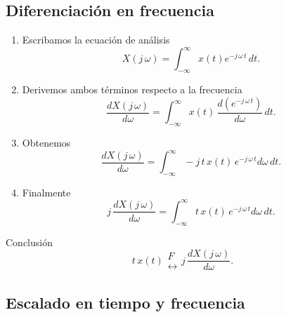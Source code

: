 \subsection{Diferenciaci\'{o}n en frecuencia}

\begin{enumerate}
\item Escribamos la ecuaci\'{o}n de an\'{a}lisis
\begin{equation}
X\left( j \, \omega \right) =\int_{-\infty }^{\infty }x\left( t\right)
e^{-j \, \omega \, t} \, dt.
\end{equation}

\item Derivemos ambos t\'{e}rminos respecto a la frecuencia
\begin{equation}
\frac{dX\left( j \, \omega \right) }{d\omega }=\int_{-\infty }^{\infty }x\left(
t\right) \, \frac{d\left( e^{-j \, \omega \, t}\right) }{d\omega } \, dt.
\end{equation}

\item Obtenemos
\begin{equation}
\frac{dX\left( j \, \omega \right) }{d\omega }=
\int_{-\infty }^{\infty}-j \, t \, x\left( t\right) \, e^{-j \, \omega \, t} {d\omega } \, dt.
\end{equation}

\item Finalmente 
\begin{equation}
j \, \frac{dX\left( j \, \omega \right) }{d\omega }=\int_{-\infty }^{\infty
}t \, x\left( t\right) \, e^{-j \, \omega \, t} {d\omega } \, dt.
\end{equation}

\end{enumerate}

Conclusi\'{o}n 
\begin{equation}
t \, x\left( t\right) 
\begin{array}{l}
F \\ 
\leftrightarrow
\end{array}
j \, \frac{dX\left( j \, \omega \right) }{d\omega }.
\end{equation}




\subsection{Escalado en tiempo y frecuencia}

